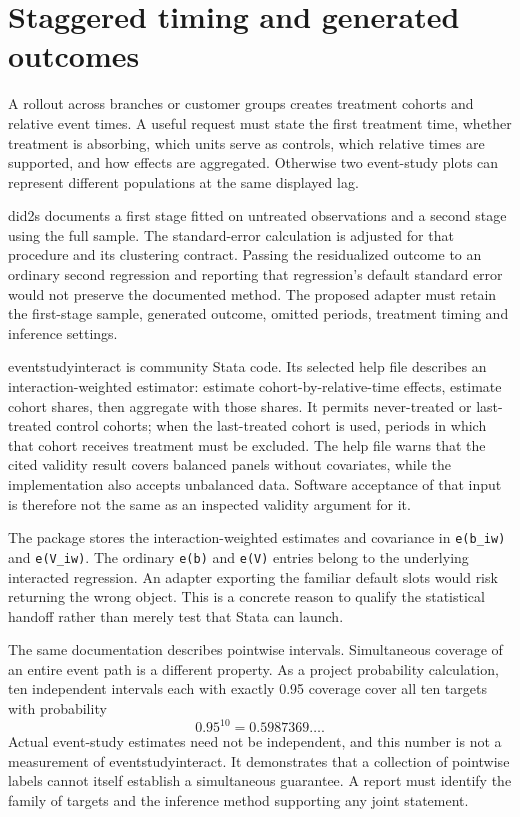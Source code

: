 \section{Staggered timing and generated outcomes}

A rollout across branches or customer groups creates treatment cohorts and
relative event times. A useful request must state the first treatment time,
whether treatment is absorbing, which units serve as controls, which relative
times are supported, and how effects are aggregated. Otherwise two event-study
plots can represent different populations at the same displayed lag.

did2s documents a first stage fitted on untreated observations and a second
stage using the full sample. The standard-error calculation is adjusted for
that procedure and its clustering contract. Passing the residualized outcome
to an ordinary second regression and reporting that regression's default
standard error would not preserve the documented method. The proposed adapter
must retain the first-stage sample, generated outcome, omitted periods,
treatment timing and inference settings. \citep{v12_sw_did2s}

eventstudyinteract is community Stata code. Its selected help file describes
an interaction-weighted estimator: estimate cohort-by-relative-time effects,
estimate cohort shares, then aggregate with those shares. It permits
never-treated or last-treated control cohorts; when the last-treated cohort
is used, periods in which that cohort receives treatment must be excluded.
The help file warns that the cited validity result covers balanced panels
without covariates, while the implementation also accepts unbalanced data.
Software acceptance of that input is therefore not the same as an inspected
validity argument for it. \citep{v12_sw_eventstudyinteract}

The package stores the interaction-weighted estimates and covariance in
\texttt{e(b\_iw)} and \texttt{e(V\_iw)}. The ordinary \texttt{e(b)} and
\texttt{e(V)} entries belong to the underlying interacted regression. An
adapter exporting the familiar default slots would risk returning the wrong
object. This is a concrete reason to qualify the statistical handoff rather
than merely test that Stata can launch.

The same documentation describes pointwise intervals. Simultaneous coverage
of an entire event path is a different property. As a project probability
calculation, ten independent intervals each with exactly 0.95 coverage cover
all ten targets with probability
\[
 0.95^{10}=0.5987369\ldots.
\]
Actual event-study estimates need not be independent, and this number is not
a measurement of eventstudyinteract. It demonstrates that a collection of
pointwise labels cannot itself establish a simultaneous guarantee. A report
must identify the family of targets and the inference method supporting any
joint statement.

